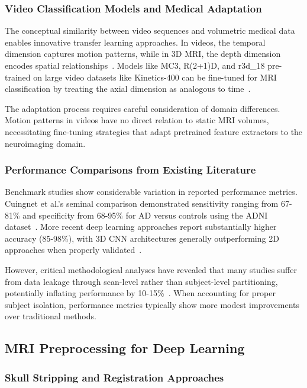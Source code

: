 \documentclass[12pt, a4paper]{article}
\begin{document}
\subsubsection{Video Classification Models and Medical Adaptation}

The conceptual similarity between video sequences and volumetric medical data enables innovative transfer learning approaches. In videos, the temporal dimension captures motion patterns, while in 3D MRI, the depth dimension encodes spatial relationships~\cite{tran2018closer}. Models like MC3, R(2+1)D, and r3d\_18 pre-trained on large video datasets like Kinetics-400 can be fine-tuned for MRI classification by treating the axial dimension as analogous to time~\cite{ebrahimi2020introducing, tran2018closer}.

The adaptation process requires careful consideration of domain differences. Motion patterns in videos have no direct relation to static MRI volumes, necessitating fine-tuning strategies that adapt pretrained feature extractors to the neuroimaging domain.

\subsubsection{Performance Comparisons from Existing Literature}

Benchmark studies show considerable variation in reported performance metrics. Cuingnet et al.'s seminal comparison demonstrated sensitivity ranging from 67-81\% and specificity from 68-95\% for AD versus controls using the ADNI dataset~\cite{cuingnet2011automatic}. More recent deep learning approaches report substantially higher accuracy (85-98\%), with 3D CNN architectures generally outperforming 2D approaches when properly validated~\cite{basaia2019automated, garg2023review}.

However, critical methodological analyses have revealed that many studies suffer from data leakage through scan-level rather than subject-level partitioning, potentially inflating performance by 10-15\%~\cite{davatzikos2019machine}. When accounting for proper subject isolation, performance metrics typically show more modest improvements over traditional methods.

\subsection{MRI Preprocessing for Deep Learning}

\subsubsection{Skull Stripping and Registration Approaches}
\end{document}
